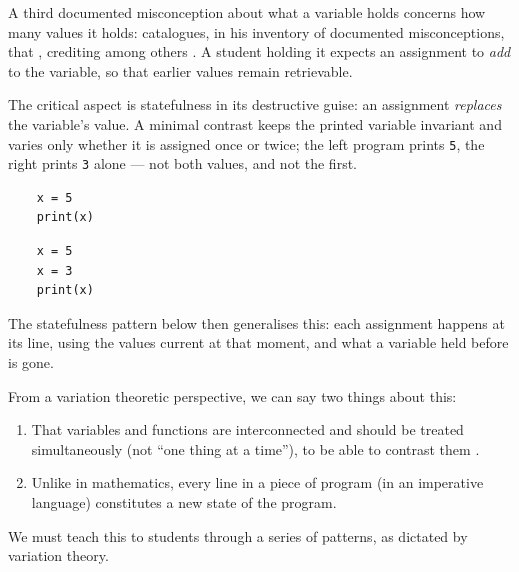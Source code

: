 A third documented misconception about what a variable holds concerns how many
values it holds: \textcite{Sorva2012Dissertation} catalogues, in his inventory
of documented misconceptions, that
, crediting among
others \textcite{Doukakis2007}.
A student holding it expects an assignment to \emph{add} to the variable, so
that earlier values remain retrievable.


The critical aspect is statefulness in its destructive guise: an assignment
\emph{replaces} the variable's value.
A minimal contrast keeps the printed variable invariant and varies only
whether it is assigned once or twice; the left program prints
\texttt{5}, the right prints \texttt{3} alone ---
not both values, and not the first.

\hfill
\begin{minipage}[t]{0.45\columnwidth}
  \begin{verbatim}
    x = 5
    print(x)
  \end{verbatim}
\end{minipage}
\hfill
\begin{minipage}[t]{0.45\columnwidth}
  \begin{verbatim}
    x = 5
    x = 3
    print(x)
  \end{verbatim}
\end{minipage}

The statefulness pattern below then generalises this: each assignment
happens at its line, using the values current at that moment, and what a
variable held before is gone.

\begin{frame}
From a variation theoretic perspective, we can say two things about this:
\begin{enumerate}
  \item<+> That variables and functions are interconnected and should be 
    treated simultaneously (not \enquote{one thing at a time}), to be able to 
    contrast them \autocite[\cf][Ch~6, pp~167--168]{NCOL}.
  \item<+> Unlike in mathematics, every line in a piece of program (in an 
    imperative language) constitutes a new state of the program.
\end{enumerate}
\end{frame}
We must teach this to students through a series of patterns, as dictated by 
variation theory.

